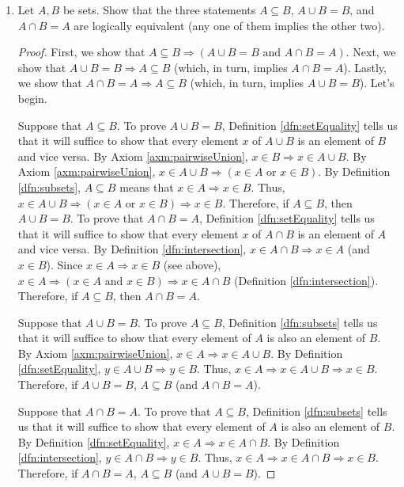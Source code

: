 \documentclass[../main.tex]{subfiles}
\begin{document}
\begin{enumerate}[ref={\thesection.\arabic*}]
\begin{prp}
\begin{proof}
        \end{proof}
    \end{prp}
    \item \label{exr:3.1.5}Let $A,B$ be sets. Show that the three statements $A\subseteq B$, $A\cup B=B$, and $A\cap B=A$ are logically equivalent (any one of them implies the other two).
    \begin{proof}
        First, we show that $A\subseteq B \Longrightarrow (A\cup B=B\text{ and }A\cap B=A)$. Next, we show that $A\cup B=B \Longrightarrow A\subseteq B$ (which, in turn, implies $A\cap B=A$). Lastly, we show that $A\cap B=A \Longrightarrow A\subseteq B$ (which, in turn, implies $A\cup B=B$). Let's begin.\par
        Suppose that $A\subseteq B$. To prove $A\cup B=B$, Definition \ref{dfn:setEquality} tells us that it will suffice to show that every element $x$ of $A\cup B$ is an element of $B$ and vice versa. By Axiom \ref{axm:pairwiseUnion}, $x\in B \Longrightarrow x\in A\cup B$. By Axiom \ref{axm:pairwiseUnion}, $x\in A\cup B \Longrightarrow (x\in A\text{ or }x\in B)$. By Definition \ref{dfn:subsets}, $A\subseteq B$ means that $x\in A \Longrightarrow x\in B$. Thus, $x\in A\cup B \Longrightarrow (x\in A\text{ or }x\in B) \Longrightarrow x\in B$. Therefore, if $A\subseteq B$, then $A\cup B=B$. To prove that $A\cap B=A$, Definition \ref{dfn:setEquality} tells us that it will suffice to show that every element $x$ of $A\cap B$ is an element of $A$ and vice versa. By Definition \ref{dfn:intersection}, $x\in A\cap B \Longrightarrow x\in A$ (and $x\in B$). Since $x\in A \Longrightarrow x\in B$ (see above), $x\in A \Longrightarrow (x\in A\text{ and }x\in B) \Longrightarrow x\in A\cap B$ (Definition \ref{dfn:intersection}). Therefore, if $A\subseteq B$, then $A\cap B=A$.\par
        Suppose that $A\cup B=B$. To prove $A\subseteq B$, Definition \ref{dfn:subsets} tells us that it will suffice to show that every element of $A$ is also an element of $B$. By Axiom \ref{axm:pairwiseUnion}, $x\in A \Longrightarrow x\in A\cup B$. By Definition \ref{dfn:setEquality}, $y\in A\cup B \Longrightarrow y\in B$. Thus, $x\in A \Longrightarrow x\in A\cup B \Longrightarrow x\in B$. Therefore, if $A\cup B=B$, $A\subseteq B$ (and $A\cap B=A$).\par
        Suppose that $A\cap B=A$. To prove that $A\subseteq B$, Definition \ref{dfn:subsets} tells us that it will suffice to show that every element of $A$ is also an element of $B$. By Definition \ref{dfn:setEquality}, $x\in A \Longrightarrow x\in A\cap B$. By Definition \ref{dfn:intersection}, $y\in A\cap B \Longrightarrow y\in B$. Thus, $x\in A \Longrightarrow x\in A\cap B \Longrightarrow x\in B$. Therefore, if $A\cap B=A$, $A\subseteq B$ (and $A\cup B=B$).

\end{proof}
\end{enumerate}
\end{document}
